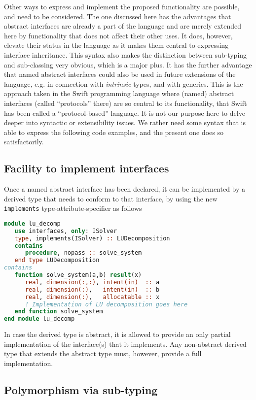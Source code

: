 \documentclass[11pt,oneside]{article}
\begin{document}
Other ways to express and implement the proposed functionality are
possible, and need to be considered. The one discussed here has the
advantages that abstract interfaces are already a part of the language
and are merely extended here by functionality that does not affect
their other uses. It does, however, elevate their status in the
language as it makes them central to expressing interface
inheritance. This syntax also makes the distinction between sub-typing
and sub-classing very obvious, which is a major plus. It has the further
advantage that named abstract interfaces could also be used in future
extensions of the language, e.g. in connection with \emph{intrinsic}
types, and with generics. This is the approach taken in the Swift
programming language where (named) abstract interfaces (called
``protocols'' there) are so central to its functionality, that Swift
has been called a ``protocol-based'' language. It is not our purpose
here to delve deeper into syntactic or extensibility issues. We rather
need some syntax that is able to express the following code examples,
and the present one does so satisfactorily.


\subsection{Facility to implement interfaces}

Once a named abstract interface has been declared, it can be
implemented by a derived type that needs to conform to that interface,
by using the new \texttt{implements} type-attribute-specifier as
follows
\begin{lstlisting}[language=Fortran]
module lu_decomp
   use interfaces, only: ISolver
   type, implements(ISolver) :: LUDecomposition
   contains
      procedure, nopass :: solve_system
   end type LUDecomposition
contains
   function solve_system(a,b) result(x)
      real, dimension(:,:), intent(in)  :: a
      real, dimension(:),   intent(in)  :: b
      real, dimension(:),   allocatable :: x
      ! Implementation of LU decomposition goes here
   end function solve_system   
end module lu_decomp
\end{lstlisting}
In case the derived type is abstract, it is allowed to provide an only
partial implementation of the interface(s) that it implements. Any
non-abstract derived type that extends the abstract type must,
however, provide a full implementation.

\subsection{Polymorphism via sub-typing}
\label{sect:declarations}
\end{document}
